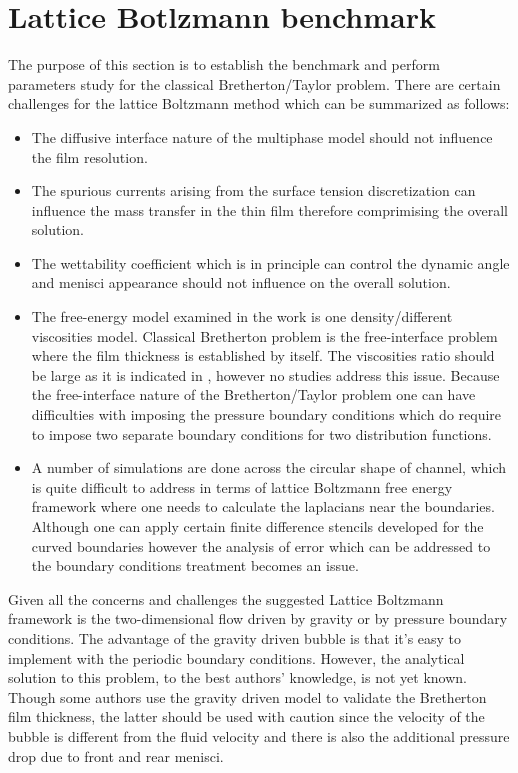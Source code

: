\documentclass{article}
\begin{document}
\section{Lattice Botlzmann benchmark}
The purpose of this section is to establish the benchmark and perform
parameters study for the classical Bretherton/Taylor problem. There are certain
challenges for the lattice Boltzmann method which can be summarized as follows:
\begin{itemize}
 \item The diffusive interface nature of the multiphase model should not
influence the film resolution.
 \item The spurious currents arising from the surface tension discretization
can influence the mass transfer in the thin film therefore comprimising the
overall solution.
 \item The wettability coefficient which is in principle can control the
dynamic angle and menisci appearance \cite{pagonabarraga-finger} should not
influence on the overall solution.
 \item The free-energy model examined in the work is one density/different
viscosities model. Classical Bretherton problem is the free-interface problem
where the film thickness is established by itself. The viscosities ratio should
be large as it is indicated in \cite{pagonabarraga-fingers}, however no studies
address this issue. Because the free-interface nature of the Bretherton/Taylor
problem one can have difficulties with imposing the pressure boundary
conditions which do require to impose two separate boundary conditions for two
distribution functions.
 \item A number of simulations are done across the circular shape of channel,
which is quite difficult to address in terms of lattice Boltzmann free energy
framework where one needs to calculate the laplacians near the boundaries.
Although one can apply certain finite difference stencils
\cite{arnold-boundary,hunt-boundary} developed for the curved boundaries
however the analysis of error which can be addressed to the boundary conditions
treatment becomes an issue. 
\end{itemize}
Given all the concerns and challenges the suggested Lattice Boltzmann framework
is the two-dimensional flow driven by gravity or by pressure boundary
conditions. The advantage of the gravity driven bubble is that it's easy to
implement with the periodic boundary conditions. However, the analytical
solution to this problem, to the best authors' knowledge, is not yet known.
Though some authors \cite{sehgal-microchannel} use the gravity driven model to
validate the Bretherton film thickness, the latter should be used with caution
since the velocity of the bubble is different from the fluid velocity and there
is also the additional pressure drop due to front and rear menisci. 
\end{document}
